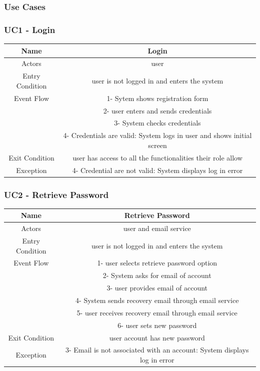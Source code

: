 \documentclass{article}
\begin{document}
\subsubsection{Use Cases}

\subsubsection*{UC1 - Login}

\setlength\tabcolsep{0pt}
\begin{tabular*}{\linewidth}{@{\extracolsep{\fill}} cc }
    \hline
    Name & Login \\ 
    \hline
    Actors & user \\ 
    \hline
    Entry Condition & user is not logged in and enters the system \\ 
    \hline
    Event Flow & 1- Sytem shows registration form\\
               & 2- user enters and sends credentials\\ 
               & 3- System checks credentials\\
               & 4- Credentials are valid: System logs in user and shows initial screen\\
    \hline
    Exit Condition & user has access to all the functionalities their role allow\\ 
    \hline
    Exception & 4- Credential are not valid: System displays log in error\\ 
    \hline
\end{tabular*}

\subsubsection*{UC2 - Retrieve Password}

\setlength\tabcolsep{0pt}
\begin{tabular*}{\linewidth}{@{\extracolsep{\fill}} cc }
    \hline
    Name & Retrieve Password \\ 
    \hline
    Actors & user and email service\\ 
    \hline
    Entry Condition & user is not logged in and enters the system \\ 
    \hline
    Event Flow & 1- user selects retrieve password option\\ 
               & 2- System asks for email of account\\
               & 3- user provides email of account\\
               & 4- System sends recovery email through email service\\
               & 5- user receives recovery email through email service\\
               & 6- user sets new password\\
    \hline
    Exit Condition & user account has new password\\ 
    \hline
    Exception & 3- Email is not associated with an account: System displays log in error\\ 
    \hline
\end{tabular*}
\end{document}
